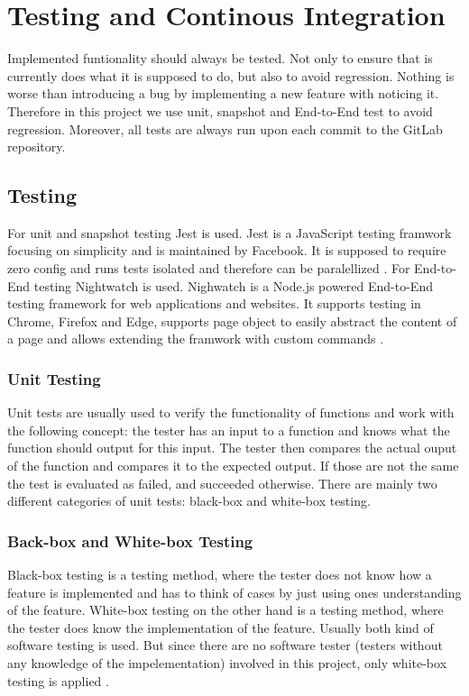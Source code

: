 \chapter{Testing and Continous Integration}
\label{chapter:testingAndCI}

Implemented funtionality should always be tested. Not only to ensure that is currently does what it is supposed to do, but also to avoid regression. Nothing is worse than introducing a bug by implementing a new feature with noticing it. Therefore in this project we use unit, snapshot and End-to-End test to avoid regression.
Moreover, all tests are always run upon each commit to the GitLab repository.

\section{Testing}
\label{section:testing}
For unit and snapshot testing Jest is used. Jest is a JavaScript testing framwork focusing on simplicity and is maintained by Facebook. It is supposed to require zero config and runs tests isolated and therefore can be paralellized \cite{Jest}. For End-to-End testing Nightwatch is used. Nighwatch is a Node.js powered End-to-End testing framework for web applications and websites. It supports testing in Chrome, Firefox and Edge, supports page object to easily abstract the content of a page and allows extending the framwork with custom commands \cite{Nightwatch}.

\subsection{Unit Testing}
\label{subsection:unitTesting}
Unit tests are usually used to verify the functionality of functions and work with the following concept: the tester has an input to a function and knows what the function should output for this input. The tester then compares the actual ouput of the function and compares it to the expected output. If those are not the same the test is evaluated as failed, and succeeded otherwise.
There are mainly two different categories of unit tests: black-box and white-box testing.

\subsection*{Back-box and White-box Testing}
Black-box testing is a testing method, where the tester does not know how a feature is implemented and has to think of cases by just using ones understanding of the feature. White-box testing on the other hand is a testing method, where the tester does know the implementation of the feature. Usually both kind of software testing is used. But since there are no software tester  (testers without any knowledge of the impelementation) involved in this project, only white-box testing is applied \cite{BlackBoxWhiteBoxTesting}.

